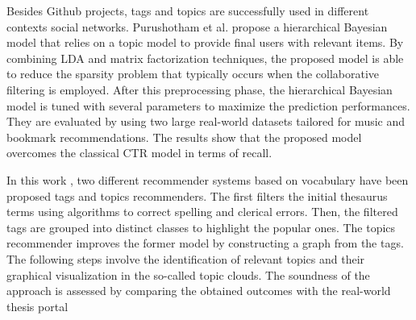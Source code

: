 Besides Github projects, tags and topics are successfully used in different contexts \ie social networks. Purushotham et al. \cite{purushotham_collaborative_nodate} propose a hierarchical Bayesian model that relies on a topic model to provide final users with relevant items. By combining  LDA and matrix factorization techniques, the proposed model is able to reduce the sparsity problem that typically occurs when the collaborative filtering is employed. After this preprocessing phase, the hierarchical Bayesian model is tuned with several parameters to maximize the prediction performances. They are evaluated by using two large real-world datasets tailored for music and bookmark recommendations. The results show that the proposed model overcomes the classical CTR model in terms of recall. 

In this work \cite{bogardi-meszoly_tag_2013}, two different recommender systems based on vocabulary have been proposed \ie tags and topics recommenders. The first filters the initial thesaurus terms using algorithms to correct spelling and clerical errors. Then, the filtered tags are grouped into distinct classes to highlight the popular ones. The topics recommender improves the former model by constructing a graph from the tags. The following steps involve the identification of relevant topics and their graphical visualization in the so-called topic clouds. The soundness of the approach is assessed by comparing the obtained outcomes with the real-world thesis portal 